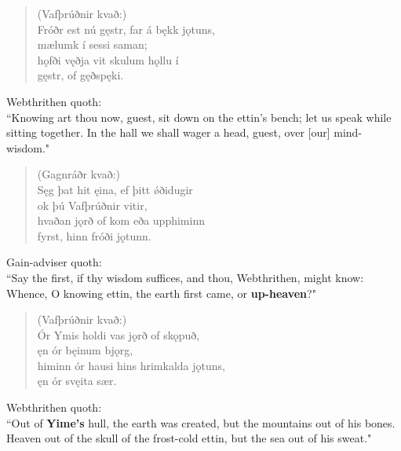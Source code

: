 \begin{verse}
(Vafþrúðnir kvað:) \\%
\bva Fróðr est nú gęstr, \hld far á bękk jǫtuns, \\%
\ind mælumk í sessi saman; \\%
hǫfði vęðja \hld vit skulum hǫllu í \\%
\ind gęstr, of gęðspęki.\\%
\end{verse}

\bvb Webthrithen quoth: \\ “Knowing art thou now, guest, sit down on the ettin's bench; let us speak while sitting together. In the hall we shall wager a head, guest, over [our] mind-wisdom." \\

\begin{verse}
(Gagnráðr kvað:) \\%
\bva Sęg þat hit ęina, \hld ef þitt ǿði\footnotemark[10] dugir \\%
\ind ok þú Vafþrúðnir vitir, \\%
hvaðan jǫrð of kom \hld eða upphiminn \\%
\ind fyrst, hinn fróði jǫtunn.\\%
\end{verse}

\bvb Gain-adviser quoth: \\ “Say the first\footnotemark[32], if thy wisdom suffices, and thou, Webthrithen, might know: Whence, O knowing ettin, the earth first came, or \textbf{up-heaven}?" \\

\begin{verse}
(Vafþrúðnir kvað:) \\%
\bva Ór Ymis holdi \hld vas jǫrð of skǫpuð, \\%
\ind ęn ór bęinum bjǫrg, \\%
himinn ór hausi \hld hins hrimkalda jǫtuns, \\%
\ind ęn ór svęita sær.\\%
\end{verse}

\bvb Webthrithen quoth: \\ “Out of \textbf{Yime's} hull\footnotemark[35], the earth was created, but the mountains out of his bones. Heaven out of the skull of the frost-cold ettin, but the sea out of his sweat.\footnotemark[36]" \\

